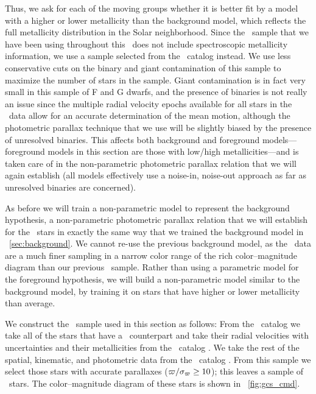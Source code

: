 Thus, we ask for each of the moving groups whether it is better fit by
a model with a higher or lower metallicity than the background model,
which reflects the full metallicity distribution in the Solar
neighborhood. Since the \Hipparcos\ sample that we have been using
throughout this \chaptername\ does not include spectroscopic
metallicity information, we use a sample selected from the \gcsabb\
catalog instead. We use less conservative cuts on the binary and giant
contamination of this sample to maximize the number of stars in the
sample. Giant contamination is in fact very small in this sample of F
and G dwarfs, and the presence of binaries is not really an issue
since the multiple radial velocity epochs available for all stars in
the \gcsabb\ data allow for an accurate determination of the mean
motion, although the photometric parallax technique that we use will
be slightly biased by the presence of unresolved binaries. This
affects both background and foreground models---foreground models in
this section are those with low/high metallicities---and is taken care
of in the non-parametric photometric parallax relation that we will
again establish (all models effectively use a noise-in, noise-out
approach as far as unresolved binaries are concerned).

As before we will train a non-parametric model to represent the
background hypothesis, a non-parametric photometric parallax relation
that we will establish for the \gcsabb\ stars in exactly the same way
that we trained the background model in
\sectionname~\ref{sec:background}. We cannot re-use the previous
background model, as the \gcsabb\ data are a much finer sampling in a
narrow color range of the rich color--magnitude diagram than our
previous \Hipparcos\ sample. Rather than using a parametric model for
the foreground hypothesis, we will build a non-parametric model
similar to the background model, by training it on stars that have
higher or lower metallicity than average.

We construct the \gcsabb\ sample used in this section as follows: From
the \gcsabb\ catalog we take all of the stars that have a
\Hipparcos\ counterpart and take their radial velocities with
uncertainties and their metallicities from the \gcsabb\ catalog
\citep[the latest reduction;][]{Holmberg07a,Holmberg09a}. We take the
rest of the spatial, kinematic, and photometric data from the
\Hipparcos\ catalog \citep{ESA97a,2007ASSL..250.....V}. From this sample we
select those stars with accurate parallaxes
($\varpi/\sigma_{\varpi} \geq 10$); this leaves a sample of
\ngcsstars\ stars. The color--magnitude diagram of these stars is
shown in \figurename~\ref{fig:gcs_cmd}.

